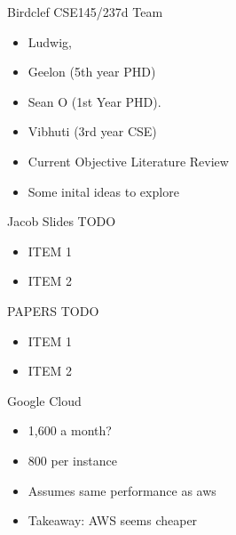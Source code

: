 \begin{frame}{Birdclef CSE145/237d Team}
    \begin{itemize}
        \item Ludwig,
        \item Geelon (5th year PHD)
        \item Sean O (1st Year PHD).
        \item Vibhuti (3rd year CSE)
        \item Current Objective Literature Review
        \item Some inital ideas to explore
    \end{itemize}
\end{frame}

\begin{frame}{Jacob Slides TODO}
    \begin{itemize}
        \item ITEM 1
        \item ITEM 2
    \end{itemize}
\end{frame}

\begin{frame}{PAPERS TODO}
    \begin{itemize}
        \item ITEM 1
        \item ITEM 2
    \end{itemize}
\end{frame}

\begin{frame}{Google Cloud}
    \begin{itemize}
        \item 1,600 a month?
        \item 800 per instance
        \item Assumes same performance as aws
        \item Takeaway: AWS seems cheaper
    \end{itemize}
\end{frame}



